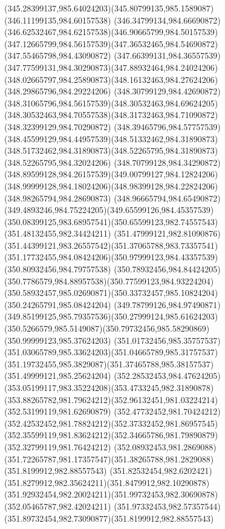 {{	\curveto(345.28399137,985.64024203)(345.80799135,985.1589087)(346.11199135,984.60157538)
	\curveto(346.34799134,984.66690872)(346.62532467,984.62157538)(346.90665799,984.50157539)
	\curveto(347.12665799,984.56157539)(347.36532465,984.54690872)(347.55465798,984.43090872)
	\curveto(347.66399131,984.36557539)(347.77599131,984.30290873)(347.88932464,984.24024206)
	\curveto(348.02665797,984.25890873)(348.16132463,984.27624206)(348.29865796,984.29224206)
	\curveto(348.30799129,984.42690872)(348.31065796,984.56157539)(348.30532463,984.69624205)
	\curveto(348.30532463,984.70557538)(348.31732463,984.71090872)(348.32399129,984.70290872)
	\curveto(348.39465796,984.57757539)(348.45599129,984.44957539)(348.51332462,984.31890873)
	\curveto(348.51732462,984.31890873)(348.52265795,984.31890873)(348.52265795,984.32024206)
	\curveto(348.70799128,984.34290872)(348.89599128,984.26157539)(349.00799127,984.12824206)
	\curveto(348.99999128,984.18024206)(348.98399128,984.22824206)(348.98265794,984.28690873)
	\curveto(348.96665794,984.65490872)(349.4893246,984.75224205)(349.65599126,984.45357539)
	\curveto(350.08399125,983.68957541)(350.65599123,982.74557543)(351.48132455,982.34424211)
	\curveto(351.47999121,982.81090876)(351.44399121,983.26557542)(351.37065788,983.73357541)
	\curveto(351.17732455,984.08424206)(350.97999123,984.43357539)(350.80932456,984.79757538)
	\curveto(350.78932456,984.84424205)(350.7786579,984.88957538)(350.77599123,984.93224204)
	\curveto(350.58932457,985.02690871)(350.33732457,985.10824204)(350.24265791,985.08424204)
	\curveto(349.78799126,984.97490871)(349.85199125,985.79357536)(350.27999124,985.61624203)
	\curveto(350.5266579,985.5149087)(350.79732456,985.58290869)(350.99999123,985.37624203)
	\curveto(351.01732456,985.35757537)(351.03065789,985.33624203)(351.04665789,985.31757537)
	\curveto(351.19732455,985.3829087)(351.37465788,985.38157537)(351.49999121,985.25624204)
	\curveto(352.28532453,984.47624205)(353.05199117,983.35224208)(353.4733245,982.31890878)
	\curveto(353.88265782,981.79624212)(352.96132451,981.03224214)(352.53199119,981.62690879)
	\curveto(352.47732452,981.70424212)(352.42532452,981.78824212)(352.37332452,981.86957545)
	\curveto(352.35599119,981.83624212)(352.34665786,981.79890879)(352.32799119,981.76424212)
	\curveto(352.08932453,981.2869088)(351.72265787,981.17357547)(351.38265788,981.2829088)
	\moveto(351.8199912,982.88557543)
	\curveto(351.82532454,982.6202421)(351.8279912,982.35624211)(351.8479912,982.10290878)
	\curveto(351.92932454,982.20024211)(351.99732453,982.30690878)(352.05465787,982.42024211)
	\curveto(351.97332453,982.57357544)(351.89732454,982.73090877)(351.8199912,982.88557543)
}}
